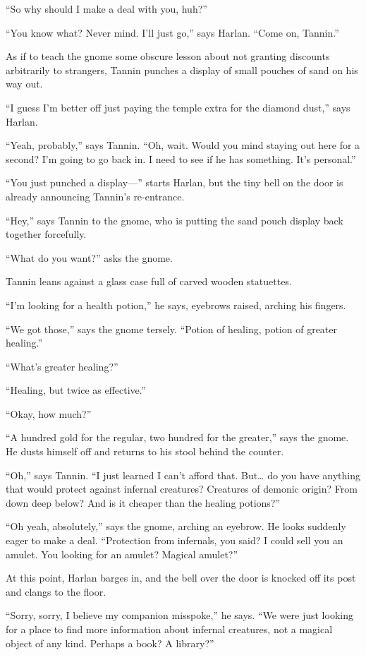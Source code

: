 \documentclass[smalldemyvopaper,11pt,twoside,onecolumn,openright,extrafontsizes]{memoir}
\begin{document}
``So why should I make a deal with you, huh?''

``You know what? Never mind. I'll just go,'' says Harlan. ``Come on,
Tannin.''

As if to teach the gnome some obscure lesson about not granting
discounts arbitrarily to strangers, Tannin punches a display of small
pouches of sand on his way out.

``I guess I'm better off just paying the temple extra for the diamond
dust,'' says Harlan.

``Yeah, probably,'' says Tannin. ``Oh, wait. Would you mind staying out
here for a second? I'm going to go back in. I need to see if he has
something. It's personal.''

``You just punched a display---'' starts Harlan, but the tiny bell on
the door is already announcing Tannin's re-entrance.

``Hey,'' says Tannin to the gnome, who is putting the sand pouch display
back together forcefully.

``What do you want?'' asks the gnome.

Tannin leans against a glass case full of carved wooden statuettes.

``I'm looking for a health potion,'' he says, eyebrows raised, arching
his fingers.

``We got those,'' says the gnome tersely. ``Potion of healing, potion of
greater healing.''

``What's greater healing?''

``Healing, but twice as effective.''

``Okay, how much?''

``A hundred gold for the regular, two hundred for the greater,'' says
the gnome. He dusts himself off and returns to his stool behind the
counter.

``Oh,'' says Tannin. ``I just learned I can't afford that. But\ldots{}
do you have anything that would protect against infernal creatures?
Creatures of demonic origin? From down deep below? And is it cheaper
than the healing potions?''

``Oh yeah, absolutely,'' says the gnome, arching an eyebrow. He looks
suddenly eager to make a deal. ``Protection from infernals, you said? I
could sell you an amulet. You looking for an amulet? Magical amulet?''

At this point, Harlan barges in, and the bell over the door is knocked
off its post and clangs to the floor.

``Sorry, sorry, I believe my companion misspoke,'' he says. ``We were
just looking for a place to find more information about infernal
creatures, not a magical object of any kind. Perhaps a book? A
library?''
\end{document}
